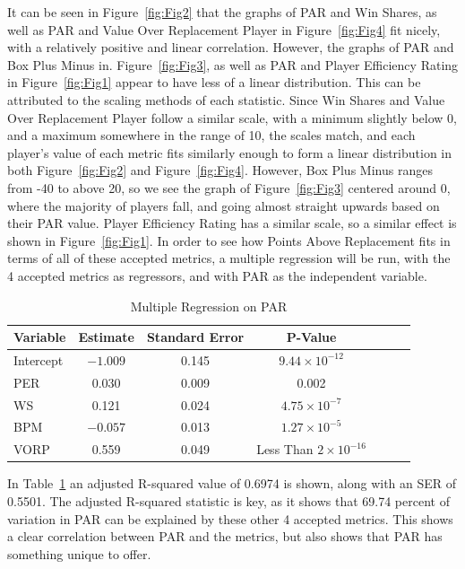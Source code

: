 \documentclass[titlepage, 12pt]{article}
\begin{document}
It can be seen in Figure~\ref{fig:Fig2} that the graphs of PAR and Win 
Shares, as 
well as PAR 
and Value Over Replacement Player in Figure~\ref{fig:Fig4}
fit nicely, with a relatively positive and linear correlation. However, the 
graphs of PAR and Box Plus Minus in. Figure~\ref{fig:Fig3}, 
as well as PAR and Player Efficiency Rating in Figure~\ref{fig:Fig1} 
appear to 
have less of a 
linear distribution. This can be 
attributed to the scaling methods of each statistic. Since Win Shares and 
Value Over Replacement Player 
follow a similar scale, with a minimum slightly below 0, and a maximum 
somewhere in the range of 10, the 
scales match, and each player's value of each metric fits similarly enough 
to form a linear distribution in both Figure~\ref{fig:Fig2} and 
Figure~\ref{fig:Fig4}. 
However, Box Plus Minus ranges from -40 to above 20, so we see the 
graph of Figure~\ref{fig:Fig3} centered around 0, where the 
majority of players fall, and going almost straight upwards based on their 
PAR value. Player Efficiency 
Rating has a similar scale, so a similar effect is shown in 
Figure~\ref{fig:Fig1}. In 
order to see 
how Points Above Replacement fits 
in terms of all of these accepted metrics, a multiple regression will be run, 
with the 4 accepted metrics as 
regressors, and with PAR as the independent variable.

\begin{table}[tbp]
  \caption{Multiple Regression on PAR}
  \label{tab:MultipleRegression}
\centering
\begin{tabular}[t]{lcccccc}
  \toprule
  Variable &  Estimate & Standard Error & P-Value\\
  \midrule
Intercept & $-1.009$  & 0.145 & $9.44 \times 10^{-12}$\\
PER & 0.030 & 0.009 & 0.002\\
WS & 0.121 & 0.024 & $4.75 \times 10^{-7}$\\
BPM & $-0.057$ & 0.013 & $1.27 \times 10^{-5}$\\
VORP & 0.559 & 0.049 & Less Than $2 \times 10^{-16}$\\
  \bottomrule
\end{tabular}
\end{table}

In Table~\ref{tab:MultipleRegression} an adjusted R-squared value of 
0.6974 is shown, along with an SER of 0.5501. The adjusted R-squared
statistic is key, as it shows that 69.74 percent of variation 
in PAR can be explained by these other 4 accepted metrics. This shows a 
clear correlation between PAR 
and the metrics, but also shows that PAR has something unique to offer.
\end{document}
